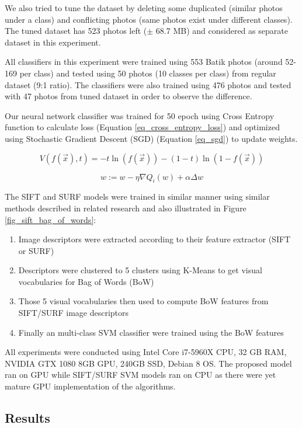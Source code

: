 \documentclass[conference]{IEEEtran}
\begin{document}
We also tried to tune the dataset by deleting some duplicated (similar photos under a class) and conflicting photos (same photos exist under different classes). The tuned dataset has 523 photos left ($\pm$ 68.7 MB) and considered as separate dataset in this experiment.

All classifiers in this experiment were trained using 553 Batik photos (around 52-169 per class) and tested using 50 photos (10 classes per class) from regular dataset (9:1 ratio). The classifiers were also trained using 476 photos and tested with 47 photos from tuned dataset in order to observe the difference.

Our neural network classifier was trained for 50 epoch using Cross Entropy function to calculate loss (Equation \ref{eq_cross_entropy_loss}) and optimized using Stochastic Gradient Descent (SGD) (Equation \ref{eq_sgd}) to update weights.

\begin{equation}
V(f(\vec{x}),t) = -t\ln(f(\vec{x}))-(1-t)\ln(1-f(\vec{x}))
\label{eq_cross_entropy_loss}
\end{equation}

\begin{equation}
w:=w-\eta \nabla Q_{i}(w)+\alpha \Delta w
\label{eq_sgd}
\end{equation}

The SIFT and SURF models were trained in similar manner using similar methods described in related research \cite{azhar2015batik} and also illustrated in Figure \ref{fig_sift_bag_of_words}:
\begin{enumerate}
\item Image descriptors were extracted according to their feature extractor (SIFT or SURF)
\item Descriptors were clustered to 5 clusters using K-Means to get visual vocabularies for Bag of Words (BoW)
\item Those 5 visual vocabularies then used to compute BoW features from SIFT/SURF image descriptors
\item Finally an multi-class SVM classifier were trained using the BoW features
\end{enumerate}

All experiments were conducted using Intel Core i7-5960X CPU, 32 GB RAM, NVIDIA GTX 1080 8GB GPU, 240GB SSD, Debian 8 OS. The proposed model ran on GPU while SIFT/SURF SVM models ran on CPU as there were yet mature GPU implementation of the algorithms.

\subsection{Results}
\end{document}
